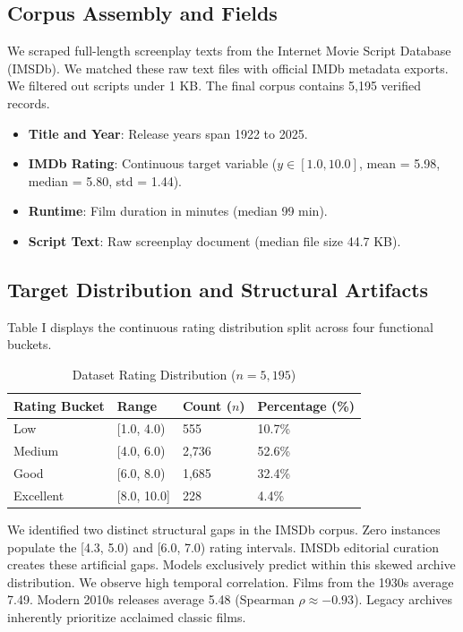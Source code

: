 \documentclass[conference]{IEEEtran}
\begin{document}
\subsection{Corpus Assembly and Fields}
We scraped full-length screenplay texts from the Internet Movie Script Database (IMSDb). We matched these raw text files with official IMDb metadata exports. We filtered out scripts under 1 KB. The final corpus contains 5,195 verified records.
\begin{itemize}
\item \textbf{Title and Year}: Release years span 1922 to 2025.
\item \textbf{IMDb Rating}: Continuous target variable ($y \in [1.0, 10.0]$, mean = 5.98, median = 5.80, std = 1.44).
\item \textbf{Runtime}: Film duration in minutes (median 99 min).
\item \textbf{Script Text}: Raw screenplay document (median file size 44.7 KB).
\end{itemize}

\subsection{Target Distribution and Structural Artifacts}
Table I displays the continuous rating distribution split across four functional buckets.

\begin{table}[htbp]
\caption{Dataset Rating Distribution ($n = 5,195$)}
\begin{center}
\begin{tabular}{|l|l|l|l|}
\hline
\textbf{Rating Bucket} & \textbf{Range} & \textbf{Count ($n$)} & \textbf{Percentage (\%)} \\
\hline
Low & [1.0, 4.0) & 555 & 10.7\% \\
\hline
Medium & [4.0, 6.0) & 2,736 & 52.6\% \\
\hline
Good & [6.0, 8.0) & 1,685 & 32.4\% \\
\hline
Excellent & [8.0, 10.0] & 228 & 4.4\% \\
\hline
\end{tabular}
\label{tab1}
\end{center}
\end{table}

We identified two distinct structural gaps in the IMSDb corpus. Zero instances populate the [4.3, 5.0) and [6.0, 7.0) rating intervals. IMSDb editorial curation creates these artificial gaps. Models exclusively predict within this skewed archive distribution. We observe high temporal correlation. Films from the 1930s average 7.49. Modern 2010s releases average 5.48 (Spearman $\rho \approx -0.93$). Legacy archives inherently prioritize acclaimed classic films.
\end{document}
